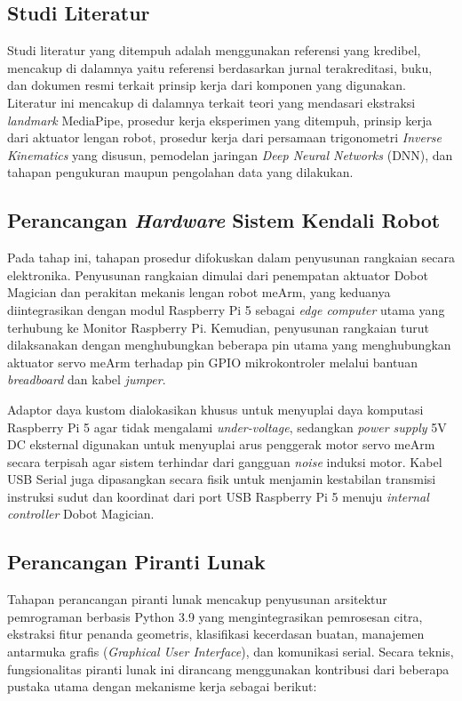\subsection{Studi Literatur}
Studi literatur yang ditempuh adalah menggunakan referensi yang kredibel, mencakup di dalamnya yaitu referensi berdasarkan jurnal terakreditasi, buku, dan dokumen resmi terkait prinsip kerja dari komponen yang digunakan. Literatur ini mencakup di dalamnya terkait teori yang mendasari ekstraksi \textit{landmark} MediaPipe, prosedur kerja eksperimen yang ditempuh, prinsip kerja dari aktuator lengan robot, prosedur kerja dari persamaan trigonometri \textit{Inverse Kinematics} yang disusun, pemodelan jaringan \textit{Deep Neural Networks} (DNN), dan tahapan pengukuran maupun pengolahan data yang dilakukan.

\subsection{Perancangan \textit{Hardware} Sistem Kendali Robot}
Pada tahap ini, tahapan prosedur difokuskan dalam penyusunan rangkaian secara elektronika. Penyusunan rangkaian dimulai dari penempatan aktuator Dobot Magician dan perakitan mekanis lengan robot meArm, yang keduanya diintegrasikan dengan modul Raspberry Pi 5 sebagai \textit{edge computer} utama yang terhubung ke Monitor Raspberry Pi. Kemudian, penyusunan rangkaian turut dilaksanakan dengan menghubungkan beberapa pin utama yang menghubungkan aktuator servo meArm terhadap pin GPIO mikrokontroler melalui bantuan \textit{breadboard} dan kabel \textit{jumper}.

Adaptor daya kustom dialokasikan khusus untuk menyuplai daya komputasi Raspberry Pi 5 agar tidak mengalami \textit{under-voltage}, sedangkan \textit{power supply} 5V DC eksternal digunakan untuk menyuplai arus penggerak motor servo meArm secara terpisah agar sistem terhindar dari gangguan \textit{noise} induksi motor. Kabel USB Serial juga dipasangkan secara fisik untuk menjamin kestabilan transmisi instruksi sudut dan koordinat dari port USB Raspberry Pi 5 menuju \textit{internal controller} Dobot Magician.

\subsection{Perancangan Piranti Lunak}
Tahapan perancangan piranti lunak mencakup penyusunan arsitektur pemrograman berbasis Python 3.9 yang mengintegrasikan pemrosesan citra, ekstraksi fitur penanda geometris, klasifikasi kecerdasan buatan, manajemen antarmuka grafis (\textit{Graphical User Interface}), dan komunikasi serial. Secara teknis, fungsionalitas piranti lunak ini dirancang menggunakan kontribusi dari beberapa pustaka utama dengan mekanisme kerja sebagai berikut:

